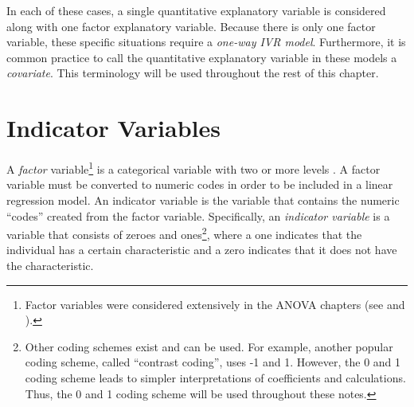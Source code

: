 \documentclass[10pt,openany]{book}\usepackage[]{graphicx}\usepackage[]{color}
\begin{document}
In each of these cases, a single quantitative explanatory variable is considered along with one factor explanatory variable.  Because there is only one factor variable, these specific situations require a \emph{one-way IVR model}.  Furthermore, it is common practice to call the quantitative explanatory variable in these models a \emph{covariate}.  This terminology will be used throughout the rest of this chapter.


\vspace{-12pt}


\section{Indicator Variables} \label{sect:IndicatorVars}
A \emph{factor} variable\footnote{Factor variables were considered extensively in the ANOVA chapters (see  and ).} is a categorical variable with two or more levels \citep{Weisberg2005}.  A factor variable must be converted to  numeric codes in order to be included in a linear regression model.  An indicator variable is the variable that contains the numeric ``codes'' created from the factor variable.  Specifically, an \emph{indicator variable} is a variable that consists of zeroes and ones\footnote{Other coding schemes exist and can be used.  For example, another popular coding scheme, called ``contrast coding'', uses -1 and 1.  However, the 0 and 1 coding scheme leads to simpler interpretations of coefficients and calculations.  Thus, the 0 and 1 coding scheme will be used throughout these notes.}, where a one indicates that the individual has a certain characteristic and a zero indicates that it does not have the characteristic.


\vspace{-12pt}

\vspace{-12pt}
\end{document}
